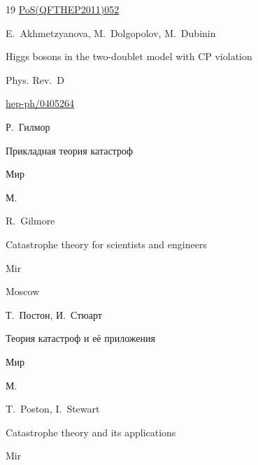 \begin{thebibliography}{19}
\eprintinfo \href{http://inspirehep.net/record/1245849/files/QFTHEP2011_052.pdf}{PoS(QFTHEP2011)052}




\by E.~Akhmetzyanova, M.~Dolgopolov, M.~Dubinin

\paper Higgs bosons in the two-doublet mo\-del with CP violation

\jour Phys. Rev.~D 






\arxiv \href{http://arxiv.org/abs/hep-ph/0405264}{hep-ph/0405264}






\by Р.~Гилмор

\book Прикладная теория катастроф


\publ Мир

\publaddr М.



\misctransl

\by R.~Gilmore

\book Catastrophe theory for scientists and engineers


\publ Mir

\publaddr Moscow








\by Т.~Постон, И.~Стюарт

\book Теория катастроф и её приложения

\publ Мир

\publaddr М.



\misctransl

\by T.~Poston, I.~Stewart

\book Catastrophe theory and its applications

\publ Mir


\end{thebibliography}
